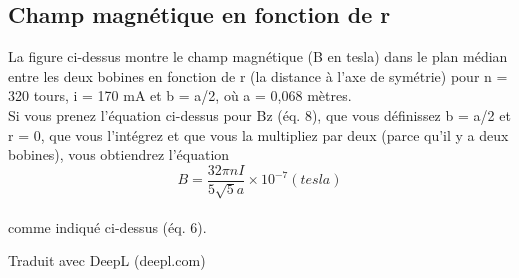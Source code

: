 \documentclass[../main.tex]{subfiles}
\begin{document}
\subsection{Champ magnétique en fonction de r}
La figure ci-dessus montre le champ magnétique (B en tesla) dans le plan médian entre les deux bobines en fonction de r (la distance à l'axe de symétrie) pour n = 320 tours, i = 170 mA et b = a/2, où a = 0,068 mètres.\\
Si vous prenez l'équation ci-dessus pour Bz (éq. 8), que vous définissez b = a/2 et r = 0, que vous l'intégrez et que vous la multipliez par deux (parce qu'il y a deux bobines), vous obtiendrez l'équation\\
$$B = \frac{32 \pi n I}{5 \sqrt{5}a} \times 10^{-7} (tesla)$$ \\
comme indiqué ci-dessus (éq. 6). 


Traduit avec DeepL (deepl.com)
\end{document}
